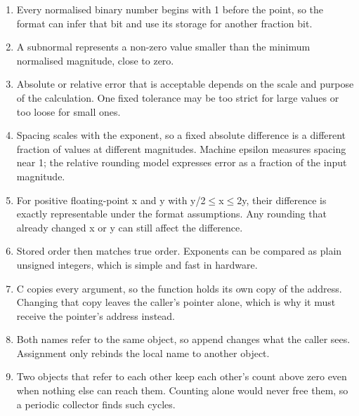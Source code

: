 \documentclass[11pt]{article}
\begin{document}
\begin{keepsection}
\begin{enumerate}
\item Every normalised binary number begins with 1 before the point, so the format can infer that bit and use its storage for another fraction bit.
\item A subnormal represents a non-zero value smaller than the minimum normalised magnitude, close to zero.
\item Absolute or relative error that is acceptable depends on the scale and purpose of the calculation. One fixed tolerance may be too strict for large values or too loose for small ones.
\item Spacing scales with the exponent, so a fixed absolute difference is a different fraction of values at different magnitudes. Machine epsilon measures spacing near 1; the relative rounding model expresses error as a fraction of the input magnitude.
\item For positive floating-point x and y with y/2\ensuremath{\leq}x\ensuremath{\leq}2y, their difference is exactly representable under the format assumptions. Any rounding that already changed x or y can still affect the difference.
\item Stored order then matches true order. Exponents can be compared as plain unsigned integers, which is simple and fast in hardware.
\item C copies every argument, so the function holds its own copy of the address. Changing that copy leaves the caller’s pointer alone, which is why it must receive the pointer’s address instead.
\item Both names refer to the same object, so append changes what the caller sees. Assignment only rebinds the local name to another object.
\item Two objects that refer to each other keep each other’s count above zero even when nothing else can reach them. Counting alone would never free them, so a periodic collector finds such cycles.
\end{enumerate}

\end{keepsection}
\end{document}
